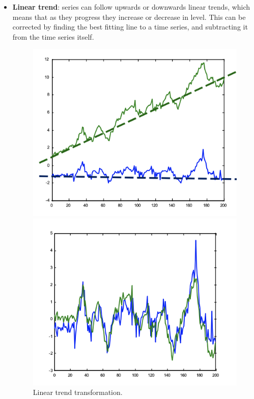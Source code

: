 \begin{itemize}
    \item \textbf{Linear trend}: series can follow upwards or downwards linear trends, which means that as they progress they increase or decrease in level. This can be corrected by finding the best fitting line to a time series, and subtracting it from the time series itself.
    \begin{figure}[ht]
        \centering
        \begin{minipage}{0.40\textwidth}
            \includegraphics[width=1\linewidth]{img/lin_trend_1.png}
        \end{minipage}
        \hfill
        \begin{minipage}{0.40\textwidth}
            \includegraphics[width=1\linewidth]{img/lin_trend_2.png}
        \end{minipage}
        \caption{Linear trend transformation.}
        \label{fig:lin-trend}
    \end{figure}


\end{itemize}
